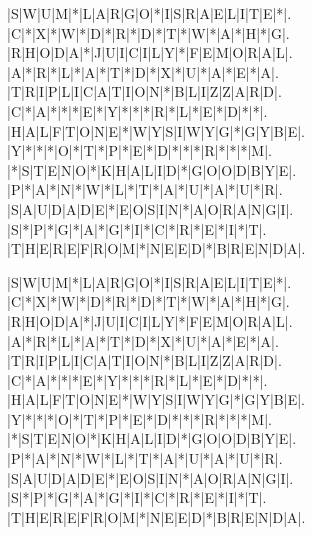 \documentclass{article}
\begin{document}
\begin{figure}[htb!]
	\begin{Puzzle}{21}{13}
		|S|W|U|M|*|L|A|R|G|O|*|I|S|R|A|E|L|I|T|E|*|.
		|C|*|X|*|W|*|D|*|R|*|D|*|T|*|W|*|A|*|H|*|G|.
		|R|H|O|D|A|*|J|U|I|C|I|L|Y|*|F|E|M|O|R|A|L|.
		|A|*|R|*|L|*|A|*|T|*|D|*|X|*|U|*|A|*|E|*|A|.
		|T|R|I|P|L|I|C|A|T|I|O|N|*|B|L|I|Z|Z|A|R|D|.
		|C|*|A|*|*|*|E|*|Y|*|*|*|R|*|L|*|E|*|D|*|*|.
		|H|A|L|F|T|O|N|E|*|W|Y|S|I|W|Y|G|*|G|Y|B|E|.
		|Y|*|*|*|O|*|T|*|P|*|E|*|D|*|*|*|R|*|*|*|M|.
		|*|S|T|E|N|O|*|K|H|A|L|I|D|*|G|O|O|D|B|Y|E|.
		|P|*|A|*|N|*|W|*|L|*|T|*|A|*|U|*|A|*|U|*|R|.
		|S|A|U|D|A|D|E|*|E|O|S|I|N|*|A|O|R|A|N|G|I|.
		|S|*|P|*|G|*|A|*|G|*|I|*|C|*|R|*|E|*|I|*|T|.
		|T|H|E|R|E|F|R|O|M|*|N|E|E|D|*|B|R|E|N|D|A|.
	\end{Puzzle}%
	\begin{PuzzleWords}{4}%
	\end{PuzzleWords}
	\begin{PuzzleWords}{5}%
	\end{PuzzleWords}
	\begin{PuzzleWords}{6}%
	\end{PuzzleWords}
	\begin{PuzzleWords}{7}%
	\end{PuzzleWords}
	\begin{PuzzleWords}{8}%
	\end{PuzzleWords}
	\begin{PuzzleWords}{9}%
	\end{PuzzleWords}
	\begin{PuzzleWords}{12}%
	\end{PuzzleWords}
\end{figure}
\newpage
\PuzzleSolution
\begin{figure}[htb!]
	\begin{Puzzle}{21}{13}
		|S|W|U|M|*|L|A|R|G|O|*|I|S|R|A|E|L|I|T|E|*|.
		|C|*|X|*|W|*|D|*|R|*|D|*|T|*|W|*|A|*|H|*|G|.
		|R|H|O|D|A|*|J|U|I|C|I|L|Y|*|F|E|M|O|R|A|L|.
		|A|*|R|*|L|*|A|*|T|*|D|*|X|*|U|*|A|*|E|*|A|.
		|T|R|I|P|L|I|C|A|T|I|O|N|*|B|L|I|Z|Z|A|R|D|.
		|C|*|A|*|*|*|E|*|Y|*|*|*|R|*|L|*|E|*|D|*|*|.
		|H|A|L|F|T|O|N|E|*|W|Y|S|I|W|Y|G|*|G|Y|B|E|.
		|Y|*|*|*|O|*|T|*|P|*|E|*|D|*|*|*|R|*|*|*|M|.
		|*|S|T|E|N|O|*|K|H|A|L|I|D|*|G|O|O|D|B|Y|E|.
		|P|*|A|*|N|*|W|*|L|*|T|*|A|*|U|*|A|*|U|*|R|.
		|S|A|U|D|A|D|E|*|E|O|S|I|N|*|A|O|R|A|N|G|I|.
		|S|*|P|*|G|*|A|*|G|*|I|*|C|*|R|*|E|*|I|*|T|.
		|T|H|E|R|E|F|R|O|M|*|N|E|E|D|*|B|R|E|N|D|A|.
	\end{Puzzle}%
\end{figure}
\end{document}
